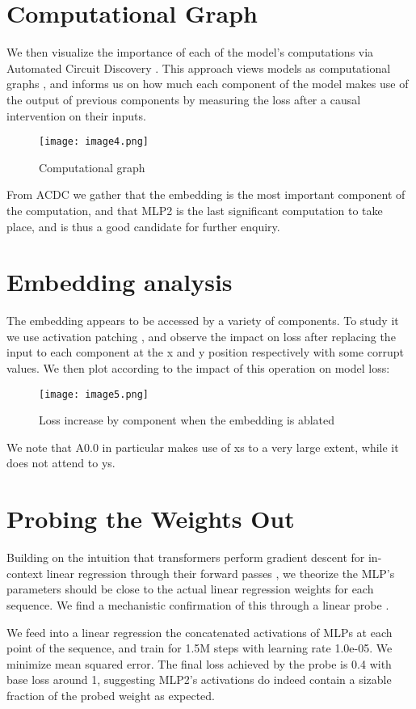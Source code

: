 \documentclass{article}
\begin{document}
\section{Computational Graph}
We then visualize the importance of each of the model’s computations via Automated Circuit Discovery \citep{conmy_2023_towards}. This approach views models as computational graphs \citep{geiger_2021_causal}, and informs us on how much each component of the model makes use of the output of previous components by measuring the loss after a causal intervention on their inputs.
\begin{figure}[htbp]
\centering
\texttt{[image: image4.png]}
\caption{Computational graph}
\end{figure}
From ACDC we gather that the embedding is the most important component of the computation, and that MLP2 is the last significant computation to take place, and is thus a good candidate for further enquiry.

\section{Embedding analysis}
The embedding appears to be accessed by a variety of components. To study it we use activation patching \citep{zhang_2023_towards}, and observe the impact on loss after replacing the input to each component at the x and y position respectively with some corrupt values.
We then plot according to the impact of this operation on model loss:
\begin{figure}[htbp]
\centering
\texttt{[image: image5.png]}
\caption{Loss increase by component when the embedding is ablated}
\end{figure}
\newpage
We note that A0.0 in particular makes use of xs to a very large extent, while it does not attend to ys.

\section{Probing the Weights Out}
Building on the intuition that transformers perform gradient descent for in-context linear regression through their forward passes \citep{vonoswald_2023_transformers}, we theorize the MLP’s parameters should be close to the actual linear regression weights for each sequence. We find a mechanistic confirmation of this through a linear probe  \citep{alain_2018_understanding}.

We feed into a linear regression the concatenated activations of MLPs at each point of the sequence, and train for 1.5M steps with learning rate 1.0e-05. We minimize mean squared error. The final loss achieved by the probe is 0.4 with base loss around 1, suggesting MLP2’s activations do indeed contain a sizable fraction of the probed weight as expected.
\end{document}
